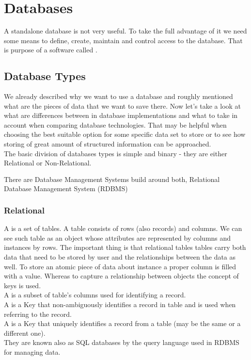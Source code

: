 \chapter{Databases}

A standalone database is not very useful. To take the full advantage of it we need some means to define, create, maintain and control access to the database. That is purpose of a software called .

\section{Database Types}

We already described why we want to use a database and roughly mentioned what are the pieces of data that we want to save there. 
Now let's take a look at what are differences between in database implementations and what to take in account when comparing database technologies.
That may be helpful when choosing the best suitable option for some specific data set to store or to see how storing of great amount of structured information can be approached. \\ 

The basic division of databases types is simple and binary - they are either Relational or Non-Relational.

There are Database Management Systems build around both, Relational Database Management System (RDBMS)

\subsection{Relational}
A  is a set of tables. A table consists of rows (also records) and columns. We can see such table as an object whose attributes are represented by columns and instances by rows. 
The important thing is that relational tables tables carry both data that need to be stored by user and the relationships between the data as well. 
To store an atomic piece of data about instance a proper column is filled with a value.
Whereas to capture a relationship between objects the concept of keys is used. \\
A  is a subset of table's columns used for identifying a record. \\
A  is a Key that non-ambiguously identifies a record in table and is used when referring to the record. \\
A  is a Key that uniquely identifies a record from a table (may be the same or a different one). \\
They are known also as SQL databases by the query language used in RDBMS for managing data.

